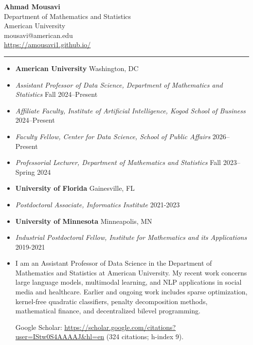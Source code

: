 \documentclass[letterpaper,11pt]{article}
\date{}
\newcommand{\resheading}[1]{\par\vspace{0.6em}\noindent{\large\textbf{#1}}\par\vspace{0.25em}}
\begin{document}
\begin{center}
{\Huge{\bf Ahmad Mousavi}}\\
Department of Mathematics and Statistics\\
{American University\\
mousavi@american.edu \\
\url{https://amousavi1.github.io/}
}
\end{center}
\vspace{-0.6cm}
\rule{7in}{0.4pt}
%

\resheading{\LARGE{Positions}}
\justifying

\begin{itemize}
\item{\bf{American University}} \hfill Washington, DC
\vspace{-0.2cm}
\item[] \textit{Assistant Professor of Data Science, Department of Mathematics and Statistics} \hfill Fall 2024--Present
\item[] \textit{Affiliate Faculty, Institute of Artificial Intelligence, Kogod School of Business} \hfill 2024--Present
\item[] \textit{Faculty Fellow, Center for Data Science, School of Public Affairs} \hfill 2026--Present
\item[] \textit{Professorial Lecturer, Department of Mathematics and Statistics} \hfill Fall 2023--Spring 2024

\item{\bf{University of Florida}} \hfill Gainesville, FL
\vspace{-0.2cm}
\item[] \textit{Postdoctoral Associate, Informatics Institute} \hfill 2021-2023

\item{\bf{University of Minnesota}} \hfill Minneapolis, MN
\vspace{-0.2cm}
\item[] \textit{Industrial Postdoctoral Fellow, Institute for Mathematics and its Applications} \hfill 2019-2021
\end{itemize}

\resheading{\LARGE{Research Summary}}
\begin{itemize}
    \item[]
I am an Assistant Professor of Data Science in the Department of Mathematics and Statistics at American University. My recent work concerns large language models, multimodal learning, and NLP applications in social media and healthcare. Earlier and ongoing work includes sparse optimization, kernel-free quadratic classifiers, penalty decomposition methods, mathematical finance, and decentralized bilevel programming.

Google Scholar: \url{https://scholar.google.com/citations?user=IStw0S4AAAAJ&hl=en} (324 citations; h-index 9).

\end{itemize}
\end{document}
